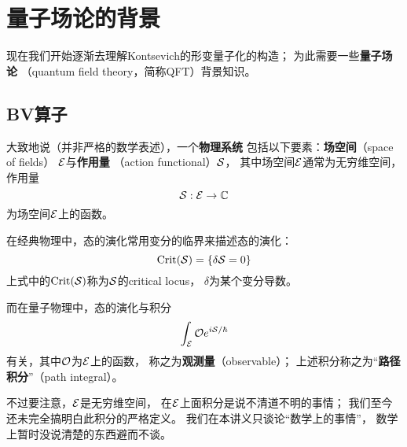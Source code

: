\chapter{量子场论的背景}
现在我们开始逐渐去理解Kontsevich的形变量子化的构造；
为此需要一些\textbf{量子场论}
（quantum field theory，简称QFT）背景知识。


\section{BV算子}

大致地说（并非严格的数学表述），一个\textbf{物理系统}
包括以下要素：\textbf{场空间}（space of fields）
$\mathcal{E}$与\textbf{作用量}
（action functional）$\mathcal{S}$，
其中场空间$\mathcal{E}$通常为无穷维空间，作用量
$$\mathcal{S}:\mathcal{E}\to \mathbb{C}$$
为场空间$\mathcal{E}$上的函数。

在经典物理中，态的演化常用变分的临界来描述态的演化：
$$\operatorname{Crit}(\mathcal{S})=\{\delta\mathcal{S}=0\}$$
上式中的$\operatorname{Crit}(\mathcal{S})$称为$\mathcal{S}$的critical locus，
$\delta$为某个变分导数。

而在量子物理中，态的演化与积分
$$\int_{\mathcal{E}}\mathcal{O} e^{i\mathcal{S}/\hbar}$$
有关，其中$\mathcal{O}$为$\mathcal{E}$上的函数，
称之为\textbf{观测量}（observable）；
上述积分称之为“\textbf{路径积分}”（path integral）。

不过要注意，$\mathcal{E}$是无穷维空间，
在$\mathcal{E}$上面积分是说不清道不明的事情；
我们至今还未完全搞明白此积分的严格定义。
我们在本讲义只谈论“数学上的事情”，
数学上暂时没说清楚的东西避而不谈。



